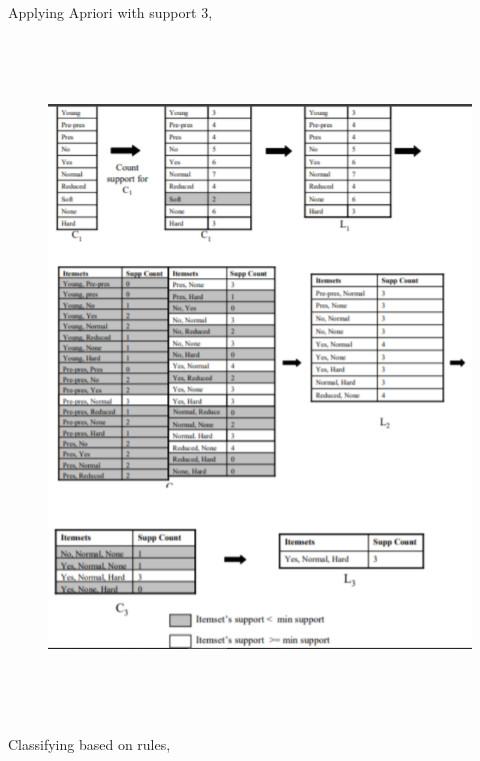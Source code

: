 \documentclass[12pt]{article}
\renewcommand{\_}{\kern-1.5pt\textunderscore\kern-1.5pt}
\begin{document}
Applying Apriori with support 3, \par


\vspace{\baselineskip}



\begin{figure}[H]
	\begin{Center}
		\includegraphics[width=6.62in,height=7.08in]{./media/image32.png}
	\end{Center}
\end{figure}



\par

Classifying based on rules,\par
\end{document}
